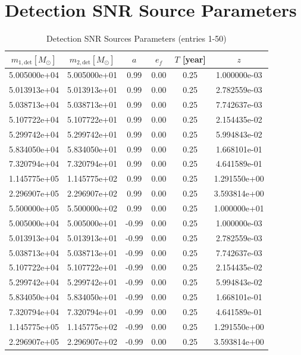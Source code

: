 \documentclass{article}
\begin{document}
\section*{Detection SNR Source Parameters}

\begin{table}[htbp]
\centering
\caption{Detection SNR Sources Parameters (entries 1-50)}
\label{tab:snr_sources_1}
\begin{tabular}{cccccc}
\hline
$m_{1,\mathrm{det}} [M_\odot]$ & $m_{2,\mathrm{det}} [M_\odot]$ & $a$ & $e_f$ & $T$ [year] & $z$ \\
\hline
5.005000e+04 & 5.005000e+01 & 0.99 & 0.00 & 0.25 & 1.000000e-03 \\
5.013913e+04 & 5.013913e+01 & 0.99 & 0.00 & 0.25 & 2.782559e-03 \\
5.038713e+04 & 5.038713e+01 & 0.99 & 0.00 & 0.25 & 7.742637e-03 \\
5.107722e+04 & 5.107722e+01 & 0.99 & 0.00 & 0.25 & 2.154435e-02 \\
5.299742e+04 & 5.299742e+01 & 0.99 & 0.00 & 0.25 & 5.994843e-02 \\
5.834050e+04 & 5.834050e+01 & 0.99 & 0.00 & 0.25 & 1.668101e-01 \\
7.320794e+04 & 7.320794e+01 & 0.99 & 0.00 & 0.25 & 4.641589e-01 \\
1.145775e+05 & 1.145775e+02 & 0.99 & 0.00 & 0.25 & 1.291550e+00 \\
2.296907e+05 & 2.296907e+02 & 0.99 & 0.00 & 0.25 & 3.593814e+00 \\
5.500000e+05 & 5.500000e+02 & 0.99 & 0.00 & 0.25 & 1.000000e+01 \\
5.005000e+04 & 5.005000e+01 & -0.99 & 0.00 & 0.25 & 1.000000e-03 \\
5.013913e+04 & 5.013913e+01 & -0.99 & 0.00 & 0.25 & 2.782559e-03 \\
5.038713e+04 & 5.038713e+01 & -0.99 & 0.00 & 0.25 & 7.742637e-03 \\
5.107722e+04 & 5.107722e+01 & -0.99 & 0.00 & 0.25 & 2.154435e-02 \\
5.299742e+04 & 5.299742e+01 & -0.99 & 0.00 & 0.25 & 5.994843e-02 \\
5.834050e+04 & 5.834050e+01 & -0.99 & 0.00 & 0.25 & 1.668101e-01 \\
7.320794e+04 & 7.320794e+01 & -0.99 & 0.00 & 0.25 & 4.641589e-01 \\
1.145775e+05 & 1.145775e+02 & -0.99 & 0.00 & 0.25 & 1.291550e+00 \\
2.296907e+05 & 2.296907e+02 & -0.99 & 0.00 & 0.25 & 3.593814e+00 \\

\end{tabular}
\end{table}
\end{document}
